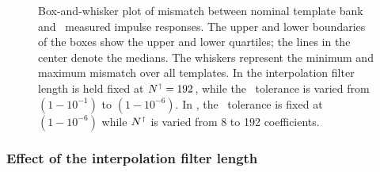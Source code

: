 \begin{figure}
		\caption{Box-and-whisker plot of mismatch between nominal
template bank and \lloid\ measured impulse responses.  The upper and lower boundaries of
the boxes show the upper and lower quartiles; the lines in the center denote the medians.
The whiskers represent the minimum and maximum mismatch over all templates.  In 
 the interpolation filter length is held fixed
at $N^\shortuparrow = 192$, while the \SVD\ tolerance is varied from
$\left(1-10^{-1}\right)$ to $\left(1-10^{-6}\right)$.  In , the \SVD\ tolerance is fixed at $\left(1-10^{-6}\right)$ while $N^\shortuparrow$ is varied from 8 to 192 coefficients.}
\end{figure}

\subsubsection{Effect of the interpolation filter length}

